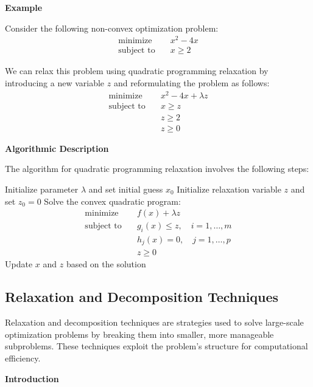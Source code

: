 \documentclass[12pt]{book} %
\begin{document}
\textbf{Example}

Consider the following non-convex optimization problem:
\begin{align*}
\text{minimize} \quad & x^2 - 4x \\
\text{subject to} \quad & x \geq 2
\end{align*}

We can relax this problem using quadratic programming relaxation by introducing a new variable \(z\) and reformulating the problem as follows:
\begin{align*}
\text{minimize} \quad & x^2 - 4x + \lambda z \\
\text{subject to} \quad & x \geq z \\
& z \geq 2 \\
& z \geq 0
\end{align*}

\textbf{Algorithmic Description}

The algorithm for quadratic programming relaxation involves the following steps:
\FloatBarrier
\begin{algorithm}
\caption{Quadratic Programming Relaxation}
\begin{algorithmic}[1]
\State Initialize parameter \(\lambda\) and set initial guess \(x_0\)
\State Initialize relaxation variable \(z\) and set \(z_0 = 0\)
\Repeat
\State Solve the convex quadratic program:
\begin{align*}
\text{minimize} \quad & f(x) + \lambda z \\
\text{subject to} \quad & g_i(x) \leq z, \quad i = 1, \ldots, m \\
& h_j(x) = 0, \quad j = 1, \ldots, p \\
& z \geq 0
\end{align*}
\State Update \(x\) and \(z\) based on the solution
\end{algorithmic}
\end{algorithm}
\FloatBarrier

\subsection{Relaxation and Decomposition Techniques}

Relaxation and decomposition techniques are strategies used to solve large-scale optimization problems by breaking them into smaller, more manageable subproblems. These techniques exploit the problem's structure for computational efficiency.

\textbf{Introduction}
\end{document}
